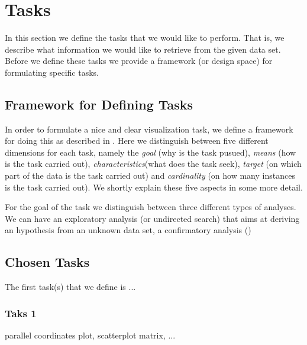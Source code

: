 \section{Tasks}

In this section we define the tasks that we would like to perform. That is, we describe what information we would like to retrieve from the given data set. Before we define these tasks we provide a framework (or design space) for formulating specific tasks.

\subsection{Framework for Defining Tasks}
In order to formulate a nice and clear visualization task, we define a framework for doing this as described in \cite{schulz2013design}. Here we distinguish between five different dimensions for each task, namely the \textit{goal} (why is the task pusued), \textit{means} (how is the task carried out), \textit{characteristics}(what does the task seek), \textit{target} (on which part of the data is the task carried out) and \textit{cardinality} (on how many instances is the task carried out). We shortly explain these five aspects in some more detail.

For the goal of the task we distinguish between three different types of analyses. We can have an exploratory analysis (or undirected search) that aims at deriving an hypothesis from an unknown data set, a confirmatory analysis ()


\subsection{Chosen Tasks}
The first task(s) that we define is ...

\subsubsection{Taks 1}

parallel coordinates plot, scatterplot matrix, ...

